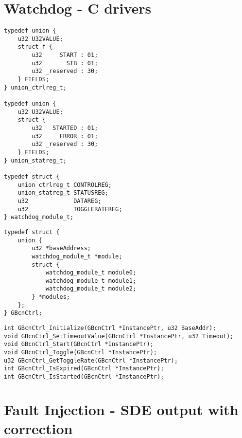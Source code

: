 \chapter{Watchdog - C drivers}
\label{sec:watchdog_drivers}

\begin{lstlisting}[style=C, caption={Watchdog - C drivers - Secondary data types definition}]
typedef union {
	u32 U32VALUE;
	struct f {
		u32     START : 01;
		u32       STB : 01;
		u32 _reserved : 30;
	} FIELDS;
} union_ctrlreg_t;

typedef union {
	u32 U32VALUE;
	struct {
		u32   STARTED : 01;
		u32     ERROR : 01;
		u32 _reserved : 30;
	} FIELDS;
} union_statreg_t;

typedef struct {
	union_ctrlreg_t CONTROLREG;
	union_statreg_t STATUSREG;
	u32       		DATAREG;
	u32 			TOGGLERATEREG;
} watchdog_module_t;
\end{lstlisting}

\newpage
\begin{lstlisting}[style=C, caption={Watchdog - C drivers - Main data type definition}]
typedef struct {
	union {
		u32 *baseAddress;
		watchdog_module_t *module;
		struct {
			watchdog_module_t module0;
			watchdog_module_t module1;
			watchdog_module_t module2;
		} *modules;
	};
} GBcnCtrl;
\end{lstlisting}

\begin{lstlisting}[style=C, caption={Watchdog - C drivers - Driver function prototypes}]
int GBcnCtrl_Initialize(GBcnCtrl *InstancePtr, u32 BaseAddr);
void GBcnCtrl_SetTimeoutValue(GBcnCtrl *InstancePtr, u32 Timeout);
void GBcnCtrl_Start(GBcnCtrl *InstancePtr);
void GBcnCtrl_Toggle(GBcnCtrl *InstancePtr);
u32 GBcnCtrl_GetToggleRate(GBcnCtrl *InstancePtr);
int GBcnCtrl_IsExpired(GBcnCtrl *InstancePtr);
int GBcnCtrl_IsStarted(GBcnCtrl *InstancePtr);
\end{lstlisting}

\chapter{Fault Injection - SDE output with correction}
\label{sec:sde_output}

